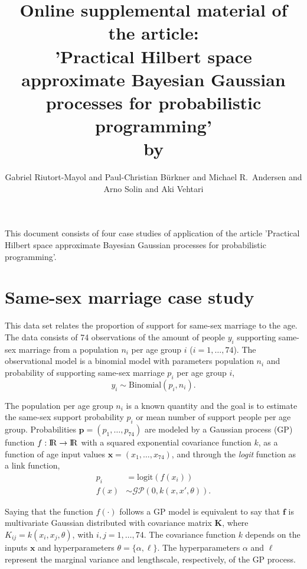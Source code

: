 \documentclass[onecolumn,a4paper,11pt]{article}
\title{Online supplemental material of the article:\\ \vspace{7mm} 'Practical Hilbert space approximate Bayesian Gaussian processes for probabilistic programming'\\ \vspace{7mm}
\normalsize by}
\author{Gabriel Riutort-Mayol and Paul-Christian Bürkner and Michael R.\ Andersen and\\
  Arno Solin and Aki Vehtari}
\date{}
\begin{document}
\maketitle

This document consists of four case studies of application of the article 'Practical Hilbert space approximate Bayesian Gaussian processes for probabilistic programming'.

\tableofcontents

\appendix


\section{Same-sex marriage case study}\label{ch5_sec_studycaseII}
This data set relates the proportion of support for same-sex marriage to the age. The data consists of 74 observations of the amount of people $y_i$ supporting same-sex marriage from a population $n_i$ per age group $i$ ($i=1,\dots,74$). The observational model is a binomial model with parameters population $n_i$ and probability of supporting same-sex marriage $p_i$ per age group $i$,
%
\begin{equation*}
y_i \sim \mathrm{Binomial}(p_i, n_i).
\end{equation*}

\noindent The population per age group $n_i$ is a known quantity and the goal is to estimate the same-sex support probability $p_i$ or mean number of support people per age group. Probabilities $\bm{p}=(p_1,\dots,p_{74})$ are modeled by a Gaussian process (GP) function $f:{\rm I\!R} \to {\rm I\!R}$ with a squared exponential covariance function $k$, as a function of age input values $\bm{x}=(x_1,\dots,x_{74})$, and through the {\it logit} function as a link function,
%
\begin{align*} \label{ch5_eq_gpprior_gay}
p_i &= \mathrm{logit}(f(x_i)) \nonumber \\
f(x) &\sim \mathcal{GP}(0, k(x,x', \theta)).
\end{align*}

\noindent Saying that the function $f(\cdot)$ follows a GP model is equivalent to say that $\bm{f}$ is multivariate Gaussian distributed with covariance matrix $\bm{K}$, where $K_{ij}=k(x_i,x_j,\theta)$, with $i,j=1,\dots,74$. The covariance function $k$ depends on the inputs $\bm{x}$ and hyperparameters $\theta=\{\alpha,\ell\}$. The hyperparameters $\alpha$ and $\ell$ represent the marginal variance and lengthscale, respectively, of the GP process.
\end{document}
